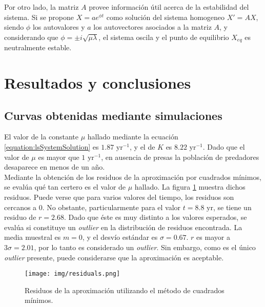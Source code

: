\documentclass[journal, monochrome]{IEEEtran}
\begin{document}
Por otro lado, la matriz $A$ provee información útil acerca de la estabilidad del sistema. Si se propone $X = a e^{\phi t} $ como solución del sistema homogeneo $ X' = AX $, siendo $\phi$ los autovalores y $a$ los autovectores asociados a la matriz $A$, y considerando que $ \phi = \pm i \sqrt{\mu\lambda}$, el sistema oscila y el punto de equilibrio $X_{eq}$ es neutralmente estable.

\vspace{0.5cm}
\section{Resultados y conclusiones}
\label{section:results}

\subsection{Curvas obtenidas mediante simulaciones}

El valor de la constante $\mu$ hallado mediante la ecuación \ref{equation:lsSystemSolution} es $1.87 \text{ yr}^{-1}$, y el de $K$ es $8.22 \text{ yr}^{-1}$. Dado que el valor de $\mu$ es mayor que $1 \text{ yr}^{-1}$, 
en ausencia de presas la población de predadores desaparece en menos de un año.\\

Mediante la obtención de los residuos de la aproximación por cuadrados mínimos, se evalúa qué tan certero es el valor de $\mu$ hallado. La figura \ref{figure:residuals} muestra dichos residuos. 
Puede verse que para varios valores del tiempo, los residuos son cercanos a $0$. No obstante, particularmente para el valor $t = 8.8 \text{ yr}$, se tiene un residuo de $r = 2.68$. Dado que éste es muy distinto a los valores esperados, se evalúa si constituye un \textit{outlier} en la distribución de residuos encontrada. La media muestral es $m = 0$, y el desvío estándar es $\sigma = 0.67$. $r$ es mayor a $3 \sigma = 2.01$, por lo tanto es considerado un \textit{outlier}. Sin embargo, como es el único \textit{outlier} presente, puede considerarse que la aproximación es aceptable.\\

\begin{figure}[htbp]
	\centering
	\texttt{[image: img/residuals.png]}
	\caption{Residuos de la aproximación utilizando el método de cuadrados mínimos.}
	\label{figure:residuals}
\end{figure}
\end{document}
